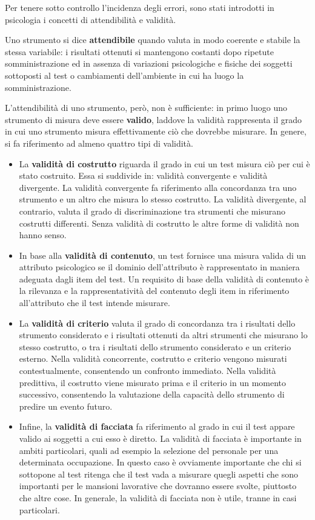 \documentclass[
]{memoir}
\providecommand{\tightlist}{%
  \setlength{\itemsep}{0pt}\setlength{\parskip}{0pt}}
\theoremstyle{definition}
\theoremstyle{definition}
\theoremstyle{definition}
\theoremstyle{definition}
\theoremstyle{remark}
\begin{document}
Per tenere sotto controllo l'incidenza degli errori, sono stati
introdotti in psicologia i concetti di attendibilità e validità.

Uno strumento si dice \textbf{attendibile} quando valuta in modo coerente e
stabile la stessa variabile: i risultati ottenuti si mantengono costanti
dopo ripetute somministrazione ed in assenza di variazioni psicologiche
e fisiche dei soggetti sottoposti al test o cambiamenti dell'ambiente in
cui ha luogo la somministrazione.

L'attendibilità di uno strumento, però, non è sufficiente: in primo luogo uno
strumento di misura deve essere \textbf{valido}, laddove la validità rappresenta
il grado in cui uno strumento misura effettivamente ciò che dovrebbe
misurare. In genere, si fa riferimento ad almeno quattro tipi di
validità.

\begin{itemize}
\tightlist
\item
  La \textbf{validità di costrutto} riguarda il grado in cui un test misura
  ciò per cui è stato costruito. Essa si suddivide in: validità
  convergente e validità divergente. La validità convergente fa
  riferimento alla concordanza tra uno strumento e un altro che misura
  lo stesso costrutto. La validità divergente, al contrario, valuta il
  grado di discriminazione tra strumenti che misurano costrutti
  differenti. Senza validità di costrutto le altre forme di validità
  non hanno senso.
\item
  In base alla \textbf{validità di contenuto}, un test fornisce una misura
  valida di un attributo psicologico se il dominio dell'attributo è
  rappresentato in maniera adeguata dagli item del test. Un requisito
  di base della validità di contenuto è la rilevanza e la
  rappresentatività del contenuto degli item in riferimento
  all'attributo che il test intende misurare.
\item
  La \textbf{validità di criterio} valuta il grado di concordanza tra i
  risultati dello strumento considerato e i risultati ottenuti da
  altri strumenti che misurano lo stesso costrutto, o tra i risultati
  dello strumento considerato e un criterio esterno. Nella validità
  concorrente, costrutto e criterio vengono misurati contestualmente,
  consentendo un confronto immediato. Nella validità predittiva, il
  costrutto viene misurato prima e il criterio in un momento
  successivo, consentendo la valutazione della capacità dello
  strumento di predire un evento futuro.
\item
  Infine, la \textbf{validità di facciata} fa riferimento al grado in cui il
  test appare valido ai soggetti a cui esso è diretto. La validità di
  facciata è importante in ambiti particolari, quali ad esempio la
  selezione del personale per una determinata occupazione. In questo
  caso è ovviamente importante che chi si sottopone al test ritenga
  che il test vada a misurare quegli aspetti che sono importanti per
  le mansioni lavorative che dovranno essere svolte, piuttosto che
  altre cose. In generale, la validità di facciata non è utile, tranne
  in casi particolari.
\end{itemize}
\end{document}
